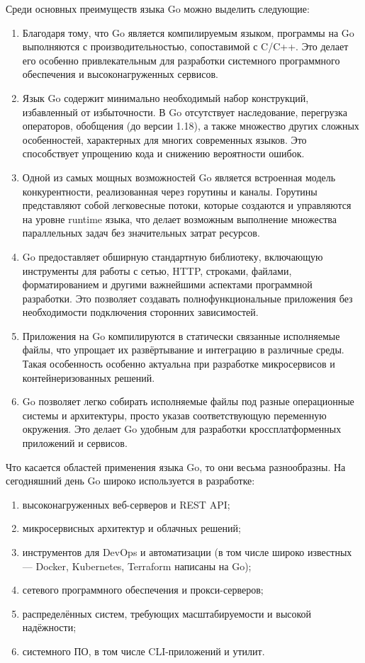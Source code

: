 \documentclass[diploma]{SCWorks}
\begin{document}
Среди основных преимуществ языка Go можно выделить следующие:
\begin{enumerate}
    \item Благодаря тому, что Go является компилируемым языком, программы на 
    Go выполняются с производительностью, сопоставимой с C/C++. Это делает 
    его особенно привлекательным для разработки системного программного 
    обеспечения и высоконагруженных сервисов.
    \item Язык Go содержит минимально необходимый набор конструкций, 
    избавленный от избыточности. В Go отсутствует наследование, перегрузка 
    операторов, обобщения (до версии 1.18), а также множество других сложных 
    особенностей, характерных для многих современных языков. Это способствует 
    упрощению кода и снижению вероятности ошибок.
    \item Одной из самых мощных возможностей Go является встроенная модель 
    конкурентности, реализованная через горутины и каналы. Горутины 
    представляют собой легковесные потоки, которые создаются и управляются 
    на уровне runtime языка, что делает возможным выполнение множества 
    параллельных задач без значительных затрат ресурсов.
    \item Go предоставляет обширную стандартную библиотеку, включающую 
    инструменты для работы с сетью, HTTP, строками, файлами, форматированием 
    и другими важнейшими аспектами программной разработки. Это позволяет 
    создавать полнофункциональные приложения без необходимости подключения 
    сторонних зависимостей.
    \item Приложения на Go компилируются в статически связанные исполняемые 
    файлы, что упрощает их развёртывание и интеграцию в различные среды. 
    Такая особенность особенно актуальна при разработке микросервисов и 
    контейнеризованных решений.
    \item Go позволяет легко собирать исполняемые файлы под разные 
    операционные системы и архитектуры, просто указав соответствующую 
    переменную окружения. Это делает Go удобным для разработки 
    кроссплатформенных приложений и сервисов.
\end{enumerate}

Что касается областей применения языка Go, то они весьма разнообразны. На 
сегодняшний день Go широко используется в разработке:
\begin{enumerate}
    \item высоконагруженных веб-серверов и REST API;
    \item микросервисных архитектур и облачных решений;
    \item инструментов для DevOps и автоматизации (в том числе широко 
    известных — Docker, Kubernetes, Terraform написаны на Go);
    \item сетевого программного обеспечения и прокси-серверов;
    \item распределённых систем, требующих масштабируемости и высокой надёжности;
    \item системного ПО, в том числе CLI-приложений и утилит.
\end{enumerate}
    
\end{document}
